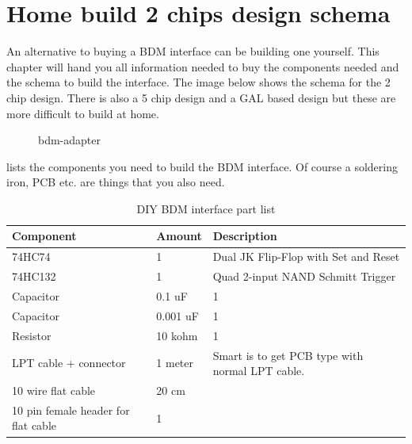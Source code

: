 \documentclass[11pt,a4paper]{book}
\newcommand{\Mfig}[1]{%
\begin{figure}
    \centering
    \missingfigure{#1}
    \caption{#1}
\end{figure}}
\begin{document}
\section{Home build 2 chips design schema}
An alternative to buying a BDM interface can be building one yourself. This chapter will hand you all
information needed to buy the components needed and the schema to build the interface. The image
below shows the schema for the 2 chip design. There is also a 5 chip design and a GAL based design
but these are more difficult to build at home.

\Mfig{bdm-adapter}

 lists the components you need to build the BDM interface. Of course a soldering
iron, PCB etc. are things that you also need.

\begin{table}
    \centering
    \begin{tabular}{lll}
        Component & Amount & Description \\
        \midrule
        74HC74 & 1 & Dual JK Flip-Flop with Set and Reset \\
        74HC132 & 1&  Quad 2-input NAND Schmitt Trigger \\
        Capacitor &0.1 uF& 1 \\
        Capacitor &0.001 uF& 1 \\
        Resistor &10 kohm & 1 \\
        LPT cable + connector &1 meter& Smart is to get PCB type with normal LPT cable.
        \\
        10 wire flat cable &20 cm  & \\
        10 pin female header for flat cable & 1
    \end{tabular}
    \caption{DIY BDM interface part list}
    \label{tab:bdm-part-list}
\end{table}
\end{document}
